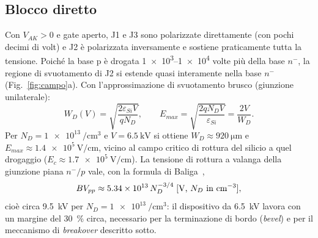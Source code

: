 \documentclass[11pt,a4paper]{article}
\newcommand{\VAK}{\ensuremath{V_{AK}}}
\newcommand{\en}[1]{\emph{#1}}   %
\begin{document}
\subsection{Blocco diretto}
Con $\VAK>0$ e gate aperto, J1 e J3 sono polarizzate direttamente (con pochi decimi di volt) e J2 è polarizzata inversamente e sostiene praticamente tutta la tensione. Poiché la base p è drogata \numrange{1e3}{1e4} volte più della base $n^-$, la regione di svuotamento di J2 si estende quasi interamente nella base $n^-$ (Fig.~\ref{fig:campo}a). Con l'approssimazione di svuotamento brusco (giunzione unilaterale):
\begin{equation}
  W_D(V) = \sqrt{\frac{2\varepsilon_{Si} V}{q N_D}}, \qquad
  E_{max} = \sqrt{\frac{2 q N_D V}{\varepsilon_{Si}}} = \frac{2V}{W_D}.
  \label{eq:WD}
\end{equation}
Per $N_D=\qty{1e13}{\per\cm\cubed}$ e $V=\qty{6.5}{\kV}$ si ottiene $W_D\approx\qty{920}{\um}$ e $E_{max}\approx\qty{1.4e5}{\V\per\cm}$, vicino al campo critico di rottura del silicio a quel drogaggio ($E_c\approx\qty{1.7e5}{\V\per\cm}$). La tensione di rottura a valanga della giunzione piana $n^-/p$ vale, con la formula di Baliga~\cite{baliga},
\begin{equation}
  BV_{pp} \approx \num{5.34e13}\, N_D^{-3/4} \;\text{[V, $N_D$ in \unit{\per\cm\cubed}]},
\end{equation}
cioè circa \qty{9.5}{\kV} per $N_D=\qty{1e13}{\per\cm\cubed}$: il dispositivo da \qty{6.5}{\kV} lavora con un margine del \qty{30}{\percent} circa, necessario per la terminazione di bordo (\en{bevel}) e per il meccanismo di \en{breakover} descritto sotto.
\end{document}
